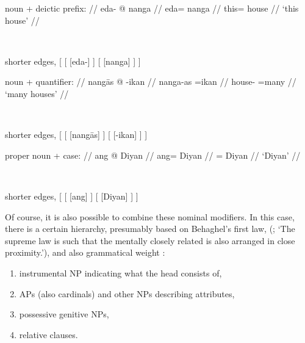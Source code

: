 \pex\label{ex:nouncltree}
\a %
	\begin{minipage}[t]{.5\linewidth}
	\begingl
		\glpreamble noun + deictic prefix: //
		\gla eda- @ nanga //
		\glb eda= nanga //
		\glc this= house //
		\glft `this house' //
	\endgl
	\end{minipage}
	~
	\begin{forest} shorter edges,
	[
		[
			[eda-]
		]
		[
			[nanga]
		]
	]
	\end{forest}

\a %
	\begin{minipage}[t]{.5\linewidth}
	\begingl
		\glpreamble noun + quantifier: //
		\gla nangās @ -ikan //
		\glb nanga-as =ikan //
		\glc house-\Parg{} =many //
		\glft `many houses' //
	\endgl
	\end{minipage}
	~
	\begin{forest} shorter edges,
	[
		[
			[nangās]
		]
		[
			[-ikan]
		]
	]
	\end{forest}

\a %
	\begin{minipage}[t]{.5\linewidth}
	\begingl
		\glpreamble proper noun + case: //
		\gla ang @ Diyan //
		\glb ang= Diyan //
		\glc \Aarg{}= Diyan //
		\glft `Diyan' //
	\endgl
	\end{minipage}
	~
	\begin{forest} shorter edges,
	[
		[
			[ang]
		]
		[
			[Diyan]
		]
	]
	\end{forest}

\xe

Of course, it is also possible to combine these nominal modifiers. In this
case, there is a certain hierarchy, presumably based on Behaghel's first law,
 (\cite[4]{behaghel1932}; `The supreme law is
such that the mentally closely related is also arranged in close proximity.'), 
and also grammatical weight \citep{wasow1997}:

\begin{enumerate}[noitemsep]
	\item instrumental NP indicating what the head consists of,
	\item APs (also cardinals) and other NPs describing attributes,
	\item possessive genitive NPs,
	\item relative clauses.
\end{enumerate}

